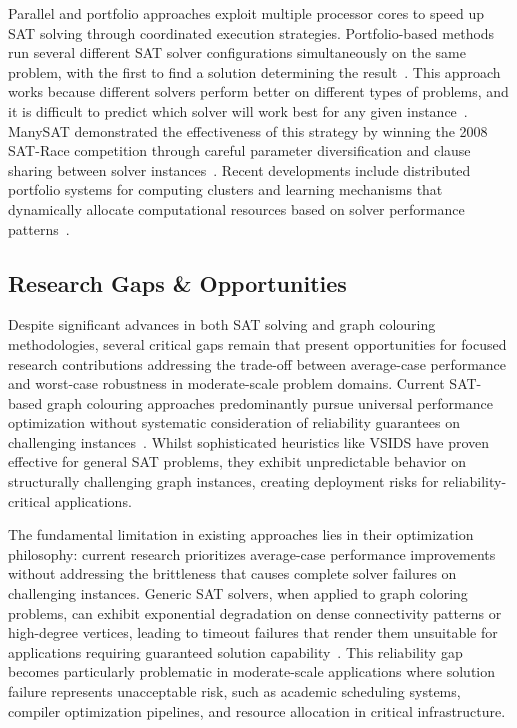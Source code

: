 Parallel and portfolio approaches exploit multiple processor cores to speed up SAT solving through coordinated execution strategies. Portfolio-based methods run several different SAT solver configurations simultaneously on the same problem, with the first to find a solution determining the result~\cite{hamadi2009manysat}. This approach works because different solvers perform better on different types of problems, and it is difficult to predict which solver will work best for any given instance~\cite{balyo2015hordesat}. ManySAT demonstrated the effectiveness of this strategy by winning the 2008 SAT-Race competition through careful parameter diversification and clause sharing between solver instances~\cite{hamadi2009manysat}. Recent developments include distributed portfolio systems for computing clusters and learning mechanisms that dynamically allocate computational resources based on solver performance patterns~\cite{guo2010diversification}.

\subsection{Research Gaps \& Opportunities}

Despite significant advances in both SAT solving and graph colouring methodologies, several critical gaps remain that present opportunities for focused research contributions addressing the trade-off between average-case performance and worst-case robustness in moderate-scale problem domains. Current SAT-based graph colouring approaches predominantly pursue universal performance optimization without systematic consideration of reliability guarantees on challenging instances~\cite{hebrard2020constraint}. Whilst sophisticated heuristics like VSIDS have proven effective for general SAT problems, they exhibit unpredictable behavior on structurally challenging graph instances, creating deployment risks for reliability-critical applications.

The fundamental limitation in existing approaches lies in their optimization philosophy: current research prioritizes average-case performance improvements without addressing the brittleness that causes complete solver failures on challenging instances. Generic SAT solvers, when applied to graph coloring problems, can exhibit exponential degradation on dense connectivity patterns or high-degree vertices, leading to timeout failures that render them unsuitable for applications requiring guaranteed solution capability~\cite{marques2009handbook}. This reliability gap becomes particularly problematic in moderate-scale applications where solution failure represents unacceptable risk, such as academic scheduling systems, compiler optimization pipelines, and resource allocation in critical infrastructure.

